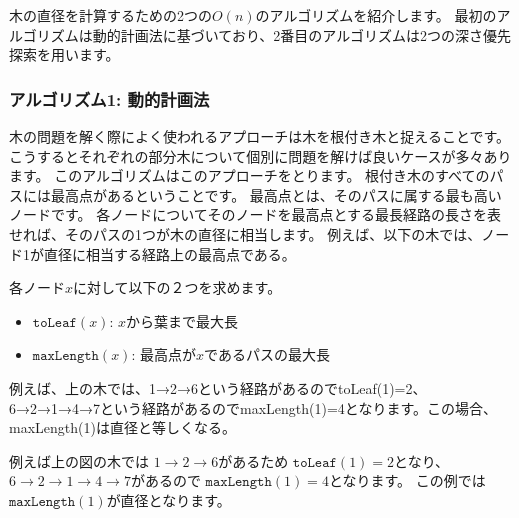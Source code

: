 木の直径を計算するための2つの$O(n)$のアルゴリズムを紹介します。
最初のアルゴリズムは動的計画法に基づいており、2番目のアルゴリズムは2つの深さ優先探索を用います。

\subsubsection{アルゴリズム1: 動的計画法}

木の問題を解く際によく使われるアプローチは木を根付き木と捉えることです。
こうするとそれぞれの部分木について個別に問題を解けば良いケースが多々あります。
このアルゴリズムはこのアプローチをとります。
根付き木のすべてのパスには最高点があるということです。
最高点とは、そのパスに属する最も高いノードです。
各ノードについてそのノードを最高点とする最長経路の長さを表せれば、そのパスの1つが木の直径に相当します。
例えば、以下の木では、ノード1が直径に相当する経路上の最高点である。

\begin{center}
\end{center}


各ノード$x$に対して以下の２つを求めます。
\begin{itemize}
\item $\texttt{toLeaf}(x)$: $x$から葉まで最大長
\item $\texttt{maxLength}(x)$: 最高点が$x$であるパスの最大長
\end{itemize}

例えば、上の木では、1→2→6という経路があるのでtoLeaf(1)=2、 6→2→1→4→7という経路があるのでmaxLength(1)=4となります。この場合、 maxLength(1)は直径と等しくなる。

例えば上の図の木では
$1 \rightarrow 2 \rightarrow 6$があるため
$\texttt{toLeaf}(1)=2$となり、
$6 \rightarrow 2 \rightarrow 1 \rightarrow 4 \rightarrow 7$があるので
$\texttt{maxLength}(1)=4$となります。
この例では $\texttt{maxLength}(1)$が直径となります。

